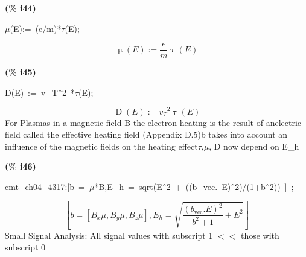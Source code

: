 \documentclass[fleqn]{article}
\begin{document}
\noindent
\begin{minipage}[t]{4.000000em}\color{red}\bfseries
(\% i44)	
\end{minipage}
\begin{minipage}[t]{\textwidth}\color{blue}
\ensuremath{\mu}(E):=\ (e/m)*\ensuremath{\tau}(E);
\end{minipage}
\[\displaystyle \tag{\% o44} 
\operatorname{\mu }(E)\operatorname{:=}\frac{e}{m} \operatorname{\tau }(E)\mbox{}
\]


\noindent
\begin{minipage}[t]{4.000000em}\color{red}\bfseries
(\% i45)	
\end{minipage}
\begin{minipage}[t]{\textwidth}\color{blue}
D(E)\ :=\ v\_T\^\ 2\ *\ensuremath{\tau}(E);
\end{minipage}
\[\displaystyle \tag{\% o45} 
\operatorname{D}(E)\operatorname{:=}{{{v_T}}^{2}} \operatorname{\tau }(E)\mbox{}
\]
For Plasmas in a magnetic field B the electron heating is the result of anelectric field called the effective heating field (Appendix D.5)b takes into account an influence of the magnetic fields on the heating effect\ensuremath{\tau},\ensuremath{\mu}, D now depend on E\_h


\noindent
\begin{minipage}[t]{4.000000em}\color{red}\bfseries
(\% i46)	
\end{minipage}
\begin{minipage}[t]{\textwidth}\color{blue}
cmt\_ch04\_4317:[b\ =\ \ensuremath{\mu}*B,E\_h\ =\ sqrt(E\^\ 2\ +\ ((b\_vec.\ E)\^\ 2)/(1+b\^\ 2))\ ]\ ;
\end{minipage}
\[\displaystyle \tag{\% o46} 
\left[ b=\left[ {B_x} \mu \operatorname{,}{B_y} \mu \operatorname{,}{B_z} \mu \right] \operatorname{,}{E_h}=\sqrt{\frac{{{\left( {b_{\ensuremath{\mathrm{vec}}}}\ensuremath{\mathrm{ . }}E\right) }^{2}}}{{{b}^{2}}+1}+{{E}^{2}}}\right] \mbox{}
\]
Small Signal Analysis: All signal values with subscript 1 \ensuremath{<}\ensuremath{<} those with subscript 0
\end{document}
